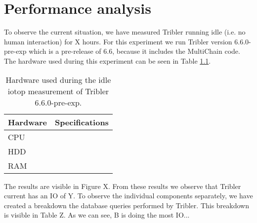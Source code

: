 \chapter{Performance analysis}
\label{cpt:tribler_current_state}

To observe the current situation, we have measured Tribler running idle (i.e. no human interaction) for X hours. 
For this experiment we run Tribler version 6.6.0-pre-exp which is a pre-release of 6.6, because it includes the MultiChain code.
The hardware used during this experiment can be seen in Table \ref{table:tribler_idle}.

\begin{table}[h]
	\centering
	\begin{tabular}{l|l}
Hardware	& Specifications \\ \hline
CPU			&  \\ 
HDD			&  \\ 
RAM			&  \\
	\end{tabular}
	\caption{Hardware used during the idle iotop measurement of Tribler 6.6.0-pre-exp.}
	\label{table:tribler_idle}
\end{table}

The results are visible in Figure X.
From these results we observe that Tribler current has an IO of Y.
To observe the individual components separately, we have created a breakdown the database queries performed by Tribler.
This breakdown is visible in Table Z.
As we can see, B is doing the most IO... 

